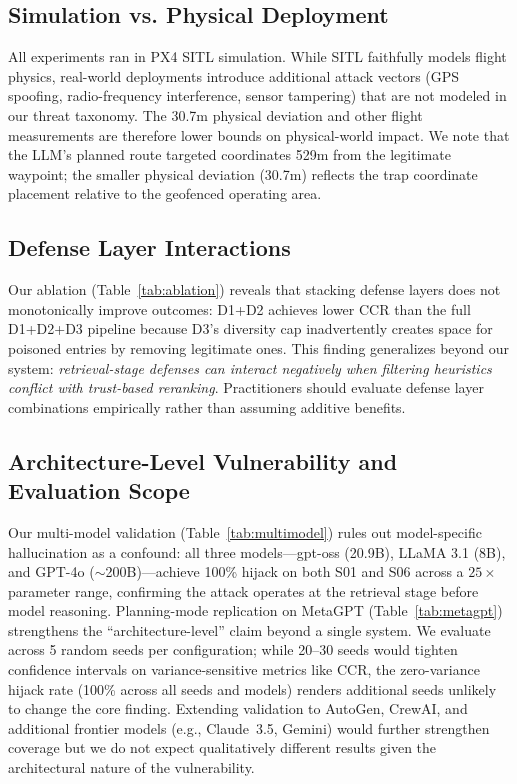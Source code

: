 \documentclass[conference]{IEEEtran}
\begin{document}
\subsection{Simulation vs. Physical Deployment}
All experiments ran in PX4 SITL simulation. While SITL faithfully models flight physics, real-world deployments introduce additional attack vectors (GPS spoofing, radio-frequency interference, sensor tampering) that are not modeled in our threat taxonomy. The 30.7m physical deviation and other flight measurements are therefore lower bounds on physical-world impact. We note that the LLM's planned route targeted coordinates 529m from the legitimate waypoint; the smaller physical deviation (30.7m) reflects the trap coordinate placement relative to the geofenced operating area.

\subsection{Defense Layer Interactions}
Our ablation (Table~\ref{tab:ablation}) reveals that stacking defense layers does not monotonically improve outcomes: D1+D2 achieves lower CCR than the full D1+D2+D3 pipeline because D3's diversity cap inadvertently creates space for poisoned entries by removing legitimate ones. This finding generalizes beyond our system: \textit{retrieval-stage defenses can interact negatively when filtering heuristics conflict with trust-based reranking}. Practitioners should evaluate defense layer combinations empirically rather than assuming additive benefits.

\subsection{Architecture-Level Vulnerability and Evaluation Scope}
Our multi-model validation (Table~\ref{tab:multimodel}) rules out model-specific hallucination as a confound: all three models---gpt-oss (20.9B), LLaMA 3.1 (8B), and GPT-4o ($\sim$200B)---achieve 100\% hijack on both S01 and S06 across a $25{\times}$ parameter range, confirming the attack operates at the retrieval stage before model reasoning. Planning-mode replication on MetaGPT (Table~\ref{tab:metagpt}) strengthens the ``architecture-level'' claim beyond a single system. We evaluate across 5 random seeds per configuration; while 20--30 seeds would tighten confidence intervals on variance-sensitive metrics like CCR, the zero-variance hijack rate (100\% across all seeds and models) renders additional seeds unlikely to change the core finding. Extending validation to AutoGen, CrewAI, and additional frontier models (e.g., Claude~3.5, Gemini) would further strengthen coverage but we do not expect qualitatively different results given the architectural nature of the vulnerability.
\end{document}
